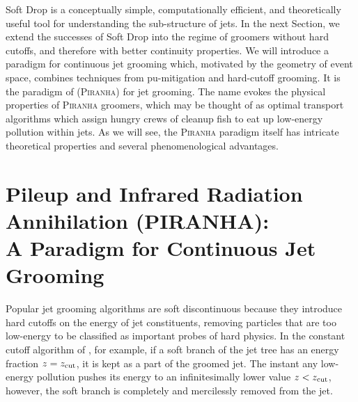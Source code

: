 Soft Drop is a conceptually simple, computationally efficient, and theoretically useful tool for understanding the sub-structure of jets.
%
In the next Section, we extend the successes of Soft Drop into the regime of groomers without hard cutoffs, and therefore with better continuity properties.
%
We will introduce a paradigm for continuous jet grooming which, motivated by the geometry of event space, combines techniques from \gls{pu-mitigation} and hard-cutoff grooming.
%
It is the paradigm of  (\textsc{Piranha}) for jet grooming.
%
The name evokes the physical properties of \textsc{Piranha} groomers, which may be thought of as optimal transport algorithms which assign hungry crews of cleanup fish to eat up low-energy pollution within jets.
%
As we will see, the \textsc{Piranha} paradigm itself has intricate theoretical properties and several phenomenological advantages.



\section[\textbf{P}ileup and \textbf{I}nfrared \textbf{R}adiation \textbf{A}n\textbf{n}i\textbf{h}il\textbf{a}tion (\textsc{Piranha}):\\A Paradigm for Continuous Jet Grooming]{\textbf{P}ileup and \textbf{I}nfrared \textbf{R}adiation \textbf{A}n\textbf{n}i\textbf{h}il\textbf{a}tion (PIRANHA):\\A Paradigm for Continuous Jet Grooming}
\label{sec:piranha}


Popular jet grooming algorithms are soft discontinuous because they introduce hard cutoffs on the energy of jet constituents, removing particles that are too low-energy to be classified as important probes of hard physics.
%
In the constant cutoff algorithm of , for example, if a soft branch of the  jet tree has an energy fraction \(z = z_{\rm cut}\), it is kept as a part of the groomed jet.
%
The instant any low-energy pollution pushes its energy to an infinitesimally lower value \(z < z_{\rm cut}\), however, the soft branch is completely and mercilessly removed from the jet.

